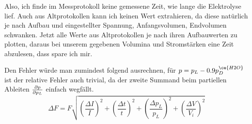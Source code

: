 Also, ich finde im Messprotokoll keine gemessene Zeit, wie lange die Elektrolyse lief. Auch aus Altprotokollen kann ich keinen Wert extrahieren, da diese natürlich je nach Aufbau und eingestellter Spannung, Anfangsvolumen, Endvolumen schwanken. Jetzt alle Werte aus Altprotokollen je nach ihren Aufbauwerten zu plotten, daraus bei unserem gegebenen Volumina und Stromstärken eine Zeit abzulesen, dass spare ich mir. 

Den Fehler würde man zumindest folgend ausrechnen, für \(p=p_L-0.9p_D^{\ce{H2O}}\) ist der relative Fehler auch trivial, da der zweite Summand beim partiellen Ableiten \(\frac{\partial p}{\partial p_L}\) einfach wegfällt.
\begin{equation}
    \Delta F=F\sqrt{\left(\frac{\Delta I}{I}\right)^2+\left(\frac{\Delta t}{t}\right)^2+\left(\frac{\Delta p_L}{p_L}\right)^2+\left(\frac{\Delta V}{V_i}\right)^2}
\end{equation}

